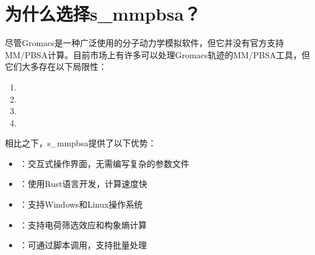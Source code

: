 \documentclass[letterpaper,10pt,english]{sphinxmanual}
\begin{document}
\section{为什么选择s\_mmpbsa？}
\label{\detokenize{introduction:s-mmpbsa}}
\sphinxAtStartPar
尽管Gromacs是一种广泛使用的分子动力学模拟软件，但它并没有官方支持MM/PB\sphinxhyphen{}SA计算。目前市场上有许多可以处理Gromacs轨迹的MM/PB\sphinxhyphen{}SA工具，但它们大多存在以下局限性：
\begin{enumerate}
%
\item {} 
\sphinxAtStartPar
{}

\item {} 
\sphinxAtStartPar
{}

\item {} 
\sphinxAtStartPar
{}

\item {} 
\sphinxAtStartPar
{}

\end{enumerate}

\sphinxAtStartPar
相比之下，s\_mmpbsa提供了以下优势：
\begin{itemize}
\item {} 
\sphinxAtStartPar
{}：交互式操作界面，无需编写复杂的参数文件

\item {} 
\sphinxAtStartPar
{}：使用Rust语言开发，计算速度快

\item {} 
\sphinxAtStartPar
{}：支持Windows和Linux操作系统

\item {} 
\sphinxAtStartPar
{}：支持电荷筛选效应和构象熵计算

\item {} 
\sphinxAtStartPar
{}：可通过脚本调用，支持批量处理

\end{itemize}
\end{document}
